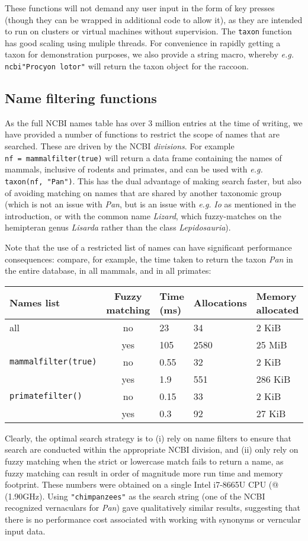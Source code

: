 \documentclass[11pt]{article}
\begin{document}
These functions will not demand any user input in the form of key
presses (though they can be wrapped in additional code to allow it), as
they are intended to run on clusters or virtual machines without
supervision. The \texttt{taxon} function has good scaling using muliple
threads. For convenience in rapidly getting a taxon for demonstration
purposes, we also provide a string macro, whereby \emph{e.g.}
\texttt{ncbi"Procyon\ lotor"} will return the taxon object for the
raccoon.

\hypertarget{name-filtering-functions}{%
\subsection{Name filtering functions}\label{name-filtering-functions}}

As the full NCBI names table has over 3 million entries at the time of
writing, we have provided a number of functions to restrict the scope of
names that are searched. These are driven by the NCBI \emph{divisions}.
For example \texttt{nf\ =\ mammalfilter(true)} will return a data frame
containing the names of mammals, inclusive of rodents and primates, and
can be used with \emph{e.g.} \texttt{taxon(nf,\ "Pan")}. This has the
dual advantage of making search faster, but also of avoiding matching on
names that are shared by another taxonomic group (which is not an issue
with \emph{Pan}, but is an issue with \emph{e.g.} \emph{Io} as mentioned
in the introduction, or with the common name \emph{Lizard}, which
fuzzy-matches on the hemipteran genus \emph{Lisarda} rather than the
class \emph{Lepidosauria}).

Note that the use of a restricted list of names can have significant
performance consequences: compare, for example, the time taken to return
the taxon \emph{Pan} in the entire database, in all mammals, and in all
primates:

\begin{longtable}[]{@{}lclll@{}}
\toprule
Names list & Fuzzy matching & Time (ms) & Allocations & Memory
allocated\tabularnewline
\midrule
\endhead
all & no & 23 & 34 & 2 KiB\tabularnewline
& yes & 105 & 2580 & 25 MiB\tabularnewline
\texttt{mammalfilter(true)} & no & 0.55 & 32 & 2 KiB\tabularnewline
& yes & 1.9 & 551 & 286 KiB\tabularnewline
\texttt{primatefilter()} & no & 0.15 & 33 & 2 KiB\tabularnewline
& yes & 0.3 & 92 & 27 KiB\tabularnewline
\bottomrule
\end{longtable}

Clearly, the optimal search strategy is to (i) rely on name filters to
ensure that search are conducted within the appropriate NCBI division,
and (ii) only rely on fuzzy matching when the strict or lowercase match
fails to return a name, as fuzzy matching can result in order of
magnitude more run time and memory footprint. These numbers were
obtained on a single Intel i7-8665U CPU (@ (1.90GHz). Using
\texttt{"chimpanzees"} as the search string (one of the NCBI recognized
vernaculars for \emph{Pan}) gave qualitatively similar results,
suggesting that there is no performance cost associated with working
with synonyms or verncular input data.
\end{document}
